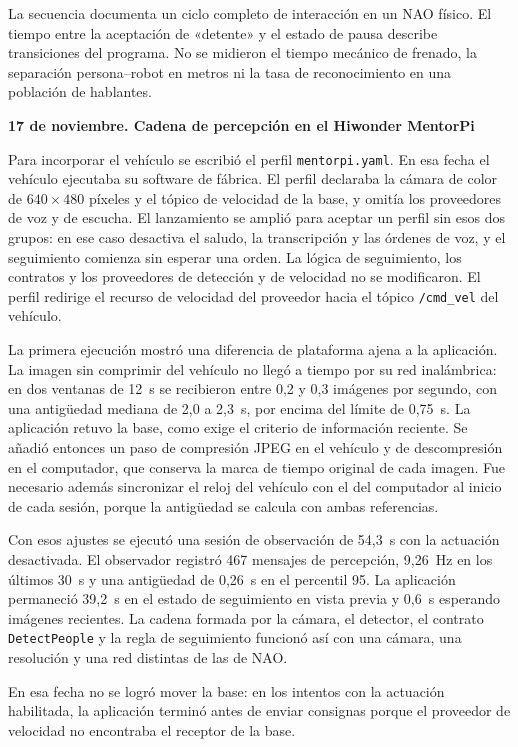 \documentclass[11pt,letterpaper]{article}
\newcommand{\code}[1]{\nolinkurl{#1}}
\begin{document}
La secuencia documenta un ciclo completo de interacción en un NAO físico. El tiempo entre la aceptación de «detente» y el estado de pausa describe transiciones del programa. No se midieron el tiempo mecánico de frenado, la separación persona--robot en metros ni la tasa de reconocimiento en una población de hablantes.

\par\medskip\noindent\textbf{17 de noviembre. Cadena de percepción en el Hiwonder MentorPi}\par

Para incorporar el vehículo se escribió el perfil \code{mentorpi.yaml}. En esa fecha el vehículo ejecutaba su software de fábrica. El perfil declaraba la cámara de color de $640\times480$ píxeles y el tópico de velocidad de la base, y omitía los proveedores de voz y de escucha. El lanzamiento se amplió para aceptar un perfil sin esos dos grupos: en ese caso desactiva el saludo, la transcripción y las órdenes de voz, y el seguimiento comienza sin esperar una orden. La lógica de seguimiento, los contratos y los proveedores de detección y de velocidad no se modificaron. El perfil redirige el recurso de velocidad del proveedor hacia el tópico \code{/cmd_vel} del vehículo.

La primera ejecución mostró una diferencia de plataforma ajena a la aplicación. La imagen sin comprimir del vehículo no llegó a tiempo por su red inalámbrica: en dos ventanas de 12~s se recibieron entre 0,2 y 0,3 imágenes por segundo, con una antigüedad mediana de 2,0 a 2,3~s, por encima del límite de 0,75~s. La aplicación retuvo la base, como exige el criterio de información reciente. Se añadió entonces un paso de compresión JPEG en el vehículo y de descompresión en el computador, que conserva la marca de tiempo original de cada imagen. Fue necesario además sincronizar el reloj del vehículo con el del computador al inicio de cada sesión, porque la antigüedad se calcula con ambas referencias.

Con esos ajustes se ejecutó una sesión de observación de 54,3~s con la actuación desactivada. El observador registró 467 mensajes de percepción, 9,26~Hz en los últimos 30~s y una antigüedad de 0,26~s en el percentil 95. La aplicación permaneció 39,2~s en el estado de seguimiento en vista previa y 0,6~s esperando imágenes recientes. La cadena formada por la cámara, el detector, el contrato \code{DetectPeople} y la regla de seguimiento funcionó así con una cámara, una resolución y una red distintas de las de NAO.

En esa fecha no se logró mover la base: en los intentos con la actuación habilitada, la aplicación terminó antes de enviar consignas porque el proveedor de velocidad no encontraba el receptor de la base.
\end{document}
